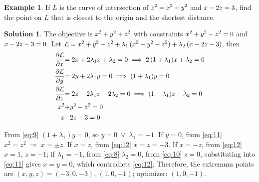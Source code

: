 \documentclass[10pt]{beamer}
\newcommand{\ds}{\displaystyle}
\newcommand{\ie}{\;\Longrightarrow\;}
\newcommand{\orr}{\;\vee\;}
\theoremstyle{definition}
\newtheorem*{ex}{Example}
\newtheorem*{sol}{Solution}
\newcommand{\pdiff}[2]{\frac{\partial #1}{\partial #2}}
\newcommand\scalemath[2]{\scalebox{#1}{\mbox{\ensuremath{\displaystyle #2}}}}
\begin{document}
\begin{frame}
\begin{ex}
  If $L$ is the curve of intersection of $\scalemath{0.95}{z^2 = x^2 + y^2}$ and $\scalemath{0.95}{x - 2z = 3}$, find the point on $L$ that is closest to the origin and the shortest distance. 
\end{ex}

\begin{sol}
  The objective is $\scalemath{0.95}{x^2 + y^2 + z^2}$ with constraints $\scalemath{0.95}{x^2 + y^2 - z^2 = 0}$ and $\scalemath{0.95}{x - 2z - 3 = 0}$. Let $\ds\scalemath{0.95}{\mathcal{L} = x^2 + y^2 + z^2 + \lambda_1\,(x^2 + y^2 - z^2) + \lambda_2\,(x - 2z - 3)}$, then \vspace{-3mm}
  \begin{align}
    \scalemath{0.95}{\pdiff{\mathcal{L}}{x}} &\scalemath{0.95}{= 2 x + 2\lambda_1 x + \lambda_2 = 0 \ie 2\,(1 + \lambda_1) x + \lambda_2 = 0}\label{eq:8}\\
    \scalemath{0.95}{\pdiff{\mathcal{L}}{y}} &\scalemath{0.95}{= 2 y + 2\lambda_1 y = 0 \ie (1 + \lambda_1)y = 0}\label{eq:9} \\
    \scalemath{0.95}{\pdiff{\mathcal{L}}{z}} &\scalemath{0.95}{= 2 z - 2\lambda_1 z - 2\lambda_2 = 0 \ie (1 - \lambda_1)z - \lambda_2 = 0}\label{eq:10}\\
    \scalemath{0.95}{x^2} &\scalemath{0.95}{+ y^2 - z^2 = 0}\label{eq:11} \\
    \scalemath{0.95}{x} &\scalemath{0.95}{- 2z - 3 = 0}\label{eq:12}
  \end{align}
  
  \vspace{-3mm}
  From \eqref{eq:9} $(1 + \lambda_1) y = 0$, so $y = 0\orr\lambda_1 = -1$. If $y = 0$, from \eqref{eq:11} $x^2 = z^2 \ie x = \pm z$. If $x = z$, from \eqref{eq:12} $x = z = -3$. If $x = -z$, from \eqref{eq:12} $x = 1$, $z = -1$; if $\lambda_1 = -1$, from \eqref{eq:8} $\lambda_2 = 0$, from \eqref{eq:10} $z = 0$, substituting into \eqref{eq:11} gives $x = y = 0$, which contradicts \eqref{eq:12}. Therefore, the extremum points are $(x, y, z) = (-3, 0, -3),\,(1, 0, -1)$; optimizer: $(1, 0, -1)$.
\end{sol}
\end{frame}
\end{document}
